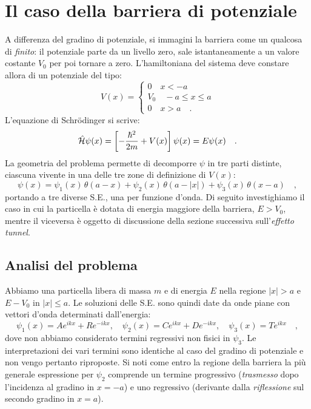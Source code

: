 \section{Il caso della barriera di potenziale}
A differenza del gradino di potenziale, si immagini la barriera come un qualcosa di \emph{finito}: il potenziale parte da un livello zero, sale istantaneamente a un valore costante $V_0$ per poi tornare a zero. L'hamiltoniana del sistema deve constare allora di un potenziale del tipo:
\[
    V(x) = \begin{cases}
        0 \quad x < -a \\
        V_0 \quad -a \leq x \leq a \\
        0 \quad x > a \quad.
    \end{cases}
\]
L'equazione di Schrödinger si scrive:
\[
    \hat{\mathcal{H}}\psi(x) = \left[ -\frac{\hbar^2}{2m} + V(x) \right]\psi(x) = E\psi(x) \quad.
\]
La geometria del problema permette di decomporre $\psi$ in tre parti distinte, ciascuna vivente in una delle tre zone di definizione di $V(x)$: 
\begin{equation}
        \psi(x) = \psi_1(x)\, \theta(a-x) + \psi_2(x)\, \theta(a-|x|)+\psi_3(x)\, \theta(x-a) \quad,
        \label{eq:hp_psi}
\end{equation}
portando a tre diverse S.E., una per funzione d'onda. Di seguito investighiamo il caso in cui la particella è dotata di energia maggiore della barriera, $E > V_0$, mentre il viceversa è oggetto di discussione della sezione successiva sull'\emph{effetto tunnel}.

\subsection{Analisi del problema}
Abbiamo una particella libera di massa $m$ e di energia $E$ nella regione $|x| > a$ e $E-V_0$ in $|x| \leq a$. Le soluzioni delle S.E. sono quindi date da onde piane con vettori d'onda determinati dall'energia:
\begin{equation}
    \psi_1(x) = Ae^{ikx} + Re^{-ikx}, \quad \psi_2(x) = Ce^{ikx} + De^{-ikx}, \quad \psi_3(x) = Te^{ikx} \quad,
    \label{eq:psi_barriera}
\end{equation}
dove non abbiamo considerato termini regressivi non fisici in $\psi_3$. Le interpretazioni dei vari termini sono identiche al caso del gradino di potenziale e non vengo pertanto riproposte. Si noti come entro la regione della barriera la più generale espressione per $\psi_2$ comprende un termine progressivo (\emph{trasmesso} dopo l'incidenza al gradino in $x = -a$) e uno regressivo (derivante dalla \emph{riflessione} sul secondo gradino in $x = a$). 

